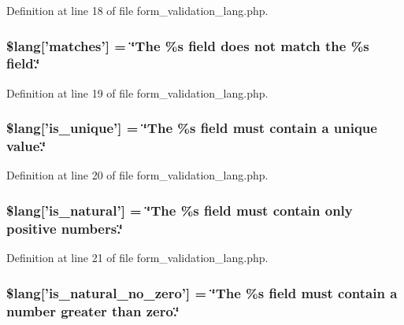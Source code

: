Definition at line 18 of file form\-\_\-validation\-\_\-lang.\-php.

\hypertarget{form__validation__lang_8php_a5a5299bf244783be43038a191bfdee03}{
\subsubsection[{\$lang}]{\setlength{\rightskip}{0pt plus 5cm}\$lang\mbox{[}'matches'\mbox{]} = \char`\"{}The \%s field does {\bf not} match the \%s field.\char`\"{}}}\label{form__validation__lang_8php_a5a5299bf244783be43038a191bfdee03}


Definition at line 19 of file form\-\_\-validation\-\_\-lang.\-php.

\hypertarget{form__validation__lang_8php_aadc3e586aaac175b851ee4bcd0c26ef2}{
\subsubsection[{\$lang}]{\setlength{\rightskip}{0pt plus 5cm}\$lang\mbox{[}'is\-\_\-unique'\mbox{]} = \char`\"{}The \%s field must contain {\bf a} unique value.\char`\"{}}}\label{form__validation__lang_8php_aadc3e586aaac175b851ee4bcd0c26ef2}


Definition at line 20 of file form\-\_\-validation\-\_\-lang.\-php.

\hypertarget{form__validation__lang_8php_a0d61ebbd2ae667c2cccf29c316b6a382}{
\subsubsection[{\$lang}]{\setlength{\rightskip}{0pt plus 5cm}\$lang\mbox{[}'is\-\_\-natural'\mbox{]} = \char`\"{}The \%s field must contain only positive numbers.\char`\"{}}}\label{form__validation__lang_8php_a0d61ebbd2ae667c2cccf29c316b6a382}


Definition at line 21 of file form\-\_\-validation\-\_\-lang.\-php.

\hypertarget{form__validation__lang_8php_a0956fbaf56ed9b9598a43ea9e9014727}{
\subsubsection[{\$lang}]{\setlength{\rightskip}{0pt plus 5cm}\$lang\mbox{[}'is\-\_\-natural\-\_\-no\-\_\-zero'\mbox{]} = \char`\"{}The \%s field must contain {\bf a} number greater than zero.\char`\"{}}}\label{form__validation__lang_8php_a0956fbaf56ed9b9598a43ea9e9014727}


